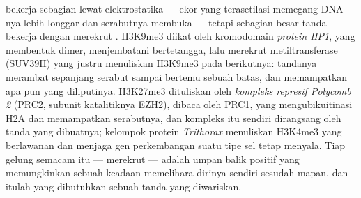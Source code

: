 \begin{proposition}\label{prop:b3:chromatin-epigenetics:readers}
 bekerja sebagian lewat elektrostatika --- ekor yang terasetilasi
memegang DNA-nya lebih longgar dan serabutnya membuka --- tetapi sebagian
besar tanda bekerja dengan merekrut . H3K9me3 diikat oleh kromodomain
\emph{protein  HP1}, yang membentuk dimer, menjembatani
 bertetangga, lalu merekrut metiltransferase (SUV39H) yang justru
menuliskan H3K9me3 pada  berikutnya: tandanya merambat sepanjang
serabut sampai bertemu sebuah batas, dan memampatkan apa pun yang
diliputinya. H3K27me3 dituliskan oleh \emph{kompleks represif Polycomb 2}
(PRC2, subunit katalitiknya EZH2), dibaca oleh PRC1, yang mengubikuitinasi
H2A dan memampatkan serabutnya, dan kompleks itu sendiri dirangsang oleh
tanda yang dibuatnya; kelompok protein \emph{Trithorax} menuliskan H3K4me3
yang berlawanan dan menjaga gen perkembangan suatu tipe sel tetap menyala.
Tiap gelung semacam itu ---  merekrut  --- adalah umpan balik
positif yang memungkinkan sebuah keadaan memelihara dirinya sendiri sesudah
mapan, dan itulah yang dibutuhkan sebuah tanda yang diwariskan.
\end{proposition}

